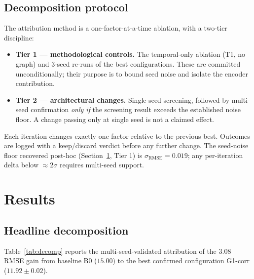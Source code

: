 \documentclass{article}
\begin{document}
\subsection{Decomposition protocol}
The attribution method is a one-factor-at-a-time ablation, with a two-tier discipline:
\begin{itemize}[itemsep=0pt,topsep=2pt]
    \item \textbf{Tier 1 --- methodological controls.} The temporal-only ablation (T1, no graph) and 3-seed re-runs of the best configurations. These are committed unconditionally; their purpose is to bound seed noise and isolate the encoder contribution.
    \item \textbf{Tier 2 --- architectural changes.} Single-seed screening, followed by multi-seed confirmation \emph{only if} the screening result exceeds the established noise floor. A change passing only at single seed is not a claimed effect.
\end{itemize}
Each iteration changes exactly one factor relative to the previous best. Outcomes are logged with a keep/discard verdict before any further change. The seed-noise floor recovered post-hoc (Section~\ref{sec:results}, Tier 1) is $\sigma_{\text{RMSE}} = 0.019$; any per-iteration delta below $\approx 2\sigma$ requires multi-seed support.

\section{Results}
\label{sec:results}

\subsection{Headline decomposition}
Table~\ref{tab:decomp} reports the multi-seed-validated attribution of the $3.08$ RMSE gain from baseline B0 ($15.00$) to the best confirmed configuration G1-corr ($11.92 \pm 0.02$).
\end{document}
